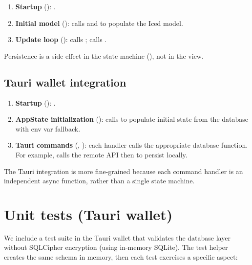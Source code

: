 \begin{enumerate}
  \item \textbf{Startup} ():  \textrightarrow{} .
  \item \textbf{Initial model} (): calls  and  to populate the Iced model.
  \item \textbf{Update loop} ():  calls ;  calls .
\end{enumerate}

Persistence is a side effect in the state machine (), not in the view.

\subsection{Tauri wallet integration}
\label{sec:tauri-integration}

\begin{enumerate}
  \item \textbf{Startup} ():  \textrightarrow{} .
  \item \textbf{AppState initialization} ():  calls  to populate initial state from the database with env var fallback.
  \item \textbf{Tauri commands} (, ): each  handler calls the appropriate database function. For example,  calls the remote API then  to persist locally.
\end{enumerate}

The Tauri integration is more fine-grained because each command handler is an independent async function, rather than a single  state machine.

\section{Unit tests (Tauri wallet)}
\label{sec:unit-tests}

We include a test suite in the Tauri wallet that validates the database layer without SQLCipher encryption (using in-memory SQLite). The test helper  creates the same schema in memory, then each test exercises a specific aspect:

